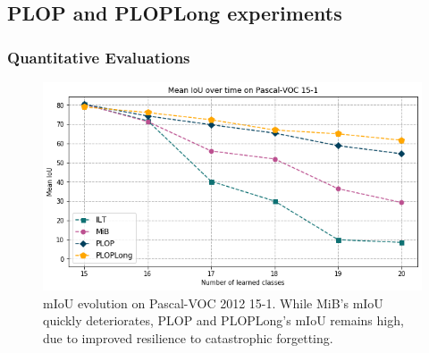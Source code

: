 \subsection{PLOP and PLOPLong experiments}
\label{sec:seg_plop_exp}

\subsubsection{Quantitative Evaluations}

\begin{figure}
    \centering
    \includegraphics[width=\linewidth]{images/seg/voc_15-1.png}
    \vspace*{-0.3cm}
    \caption{\ac{mIoU} evolution on Pascal-VOC 2012 15-1. While MiB's \ac{mIoU} quickly
        deteriorates, PLOP and PLOPLong's \ac{mIoU} remains high, due to improved resilience to
        catastrophic forgetting.}
    \label{fig:seg_plot_voc_15-1}
\end{figure}




